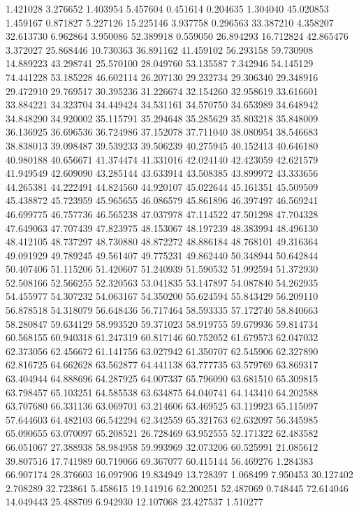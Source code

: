 1.421028
3.276652
1.403954
5.457604
0.451614
0.204635
1.304040
45.020853
1.459167
0.871827
5.227126
15.225146
3.937758
0.296563
33.387210
4.358207
32.613730
6.962864
3.950086
52.389918
0.559050
26.894293
16.712824
42.865476
3.372027
25.868446
10.730363
36.891162
41.459102
56.293158
59.730908
14.889223
43.298741
25.570100
28.049760
53.135587
7.342946
54.145129
74.441228
53.185228
46.602114
26.207130
29.232734
29.306340
29.348916
29.472910
29.769517
30.395236
31.226674
32.154260
32.958619
33.616601
33.884221
34.323704
34.449424
34.531161
34.570750
34.653989
34.648942
34.848290
34.920002
35.115791
35.294648
35.285629
35.803218
35.848009
36.136925
36.696536
36.724986
37.152078
37.711040
38.080954
38.546683
38.838013
39.098487
39.539233
39.506239
40.275945
40.152413
40.646180
40.980188
40.656671
41.374474
41.331016
42.024140
42.423059
42.621579
41.949549
42.609090
43.285144
43.633914
43.508385
43.899972
43.333656
44.265381
44.222491
44.824560
44.920107
45.022644
45.161351
45.509509
45.438872
45.723959
45.965655
46.086579
45.861896
46.397497
46.569241
46.699775
46.757736
46.565238
47.037978
47.114522
47.501298
47.704328
47.649063
47.707439
47.823975
48.153067
48.197239
48.383994
48.496130
48.412105
48.737297
48.730880
48.872272
48.886184
48.768101
49.316364
49.091929
49.789245
49.561407
49.775231
49.862440
50.348944
50.642844
50.407406
51.115206
51.420607
51.240939
51.590532
51.992594
51.372930
52.508166
52.566255
52.320563
53.041835
53.147897
54.087840
54.262935
54.455977
54.307232
54.063167
54.350200
55.624594
55.843429
56.209110
56.878518
54.318079
56.648436
56.717464
58.593335
57.172740
58.840663
58.280847
59.634129
58.993520
59.371023
58.919755
59.679936
59.814734
60.568155
60.940318
61.247319
60.817146
60.752052
61.679573
62.047032
62.373056
62.456672
61.141756
63.027942
61.350707
62.545906
62.327890
62.816725
64.662628
63.562877
64.441138
63.777735
63.579769
63.869317
63.404944
64.888696
64.287925
64.007337
65.796090
63.681510
65.309815
63.798457
65.103251
64.585538
63.634875
64.040741
64.143410
64.202588
63.707680
66.331136
63.069701
63.214606
63.469525
63.119923
65.115097
57.644603
64.482103
66.542294
62.342559
65.321763
62.632097
56.345985
65.090655
63.070097
65.208521
26.728469
63.952555
52.171322
62.483582
66.051067
27.388938
58.984958
59.993969
32.073206
60.525991
21.085612
39.807516
17.741989
60.719066
69.367077
60.415144
56.469276
1.284383
66.907174
28.376603
16.097906
19.834949
13.728397
1.068499
7.950453
30.127402
2.708289
32.723861
5.458615
19.141916
62.200251
52.487069
0.748445
72.614046
14.049443
25.488709
6.942930
12.107068
23.427537
1.510277
